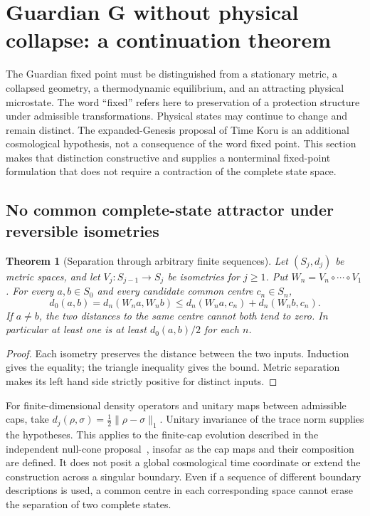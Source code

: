 \documentclass[11pt,a4paper]{article}
\newtheorem{theorem}{Theorem}[section]\newtheorem{proposition}[theorem]{Proposition}\newtheorem{definition}[theorem]{Definition}\newtheorem{example}[theorem]{Example}
\begin{document}
\section{Guardian G without physical collapse: a continuation theorem}\label{sec:continuation}
The Guardian fixed point must be distinguished from a stationary metric, a collapsed geometry, a thermodynamic equilibrium, and an attracting physical microstate. The word ``fixed'' refers here to preservation of a protection structure under admissible transformations. Physical states may continue to change and remain distinct. The expanded-Genesis proposal of Time Koru is an additional cosmological hypothesis, not a consequence of the word fixed point. This section makes that distinction constructive and supplies a nonterminal fixed-point formulation that does not require a contraction of the complete state space.

\subsection{No common complete-state attractor under reversible isometries}
\begin{theorem}[Separation through arbitrary finite sequences]\label{thm:nocommon}
Let $(S_j,d_j)$ be metric spaces, and let $V_j:S_{j-1}\to S_j$ be isometries for $j\geq1$. Put $W_n=V_n\circ\cdots\circ V_1$. For every $a,b\in S_0$ and every candidate common centre $c_n\in S_n$,
\[
 d_0(a,b)=d_n(W_n a,W_n b)\leq d_n(W_n a,c_n)+d_n(W_n b,c_n).
\]
If $a\ne b$, the two distances to the same centre cannot both tend to zero. In particular at least one is at least $d_0(a,b)/2$ for each $n$.
\end{theorem}
\begin{proof} Each isometry preserves the distance between the two inputs. Induction gives the equality; the triangle inequality gives the bound. Metric separation makes its left hand side strictly positive for distinct inputs.\end{proof}
For finite-dimensional density operators and unitary maps between admissible caps, take $d_j(\rho,\sigma)=\frac12\|\rho-\sigma\|_1$. Unitary invariance of the trace norm supplies the hypotheses. This applies to the finite-cap evolution described in the independent null-cone proposal~\cite{chandra,nielsen}, insofar as the cap maps and their composition are defined. It does not posit a global cosmological time coordinate or extend the construction across a singular boundary. Even if a sequence of different boundary descriptions is used, a common centre in each corresponding space cannot erase the separation of two complete states.
\end{document}
